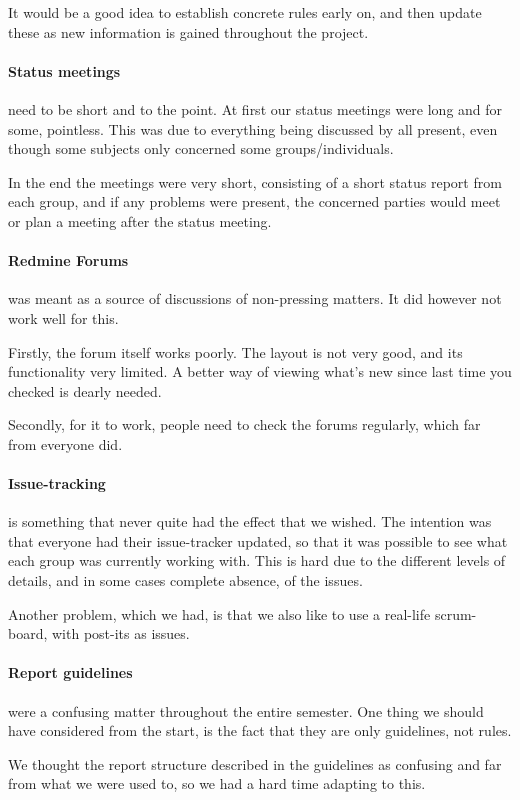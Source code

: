 It would be a good idea to establish concrete rules early on, and then update these as new information is gained throughout the project.

\paragraph{Status meetings} need to be short and to the point.
At first our status meetings were long and for some, pointless.
This was due to everything being discussed by all present, even though some subjects only concerned some groups/individuals.

In the end the meetings were very short, consisting of a short status report from each group, and if any problems were present, the concerned parties would meet or plan a meeting after the status meeting.

\paragraph{Redmine Forums} was meant as a source of discussions of non-pressing matters.
It did however not work well for this.

Firstly, the forum itself works poorly.
The layout is not very good, and its functionality very limited.
A better way of viewing what's new since last time you checked is dearly needed.

Secondly, for it to work, people need to check the forums regularly, which far from everyone did.

\paragraph{Issue-tracking} is something that never quite had the effect that we wished.
The intention was that everyone had their issue-tracker updated, so that it was possible to see what each group was currently working with.
This is hard due to the different levels of details, and in some cases complete absence, of the issues.

Another problem, which we had, is that we also like to use a real-life scrum-board, with post-its as issues.

\paragraph{Report guidelines} were a confusing matter throughout the entire semester.
One thing we should have considered from the start, is the fact that they are only guidelines, not rules.

We thought the report structure described in the guidelines as confusing and far from what we were used to, so we had a hard time adapting to this.
